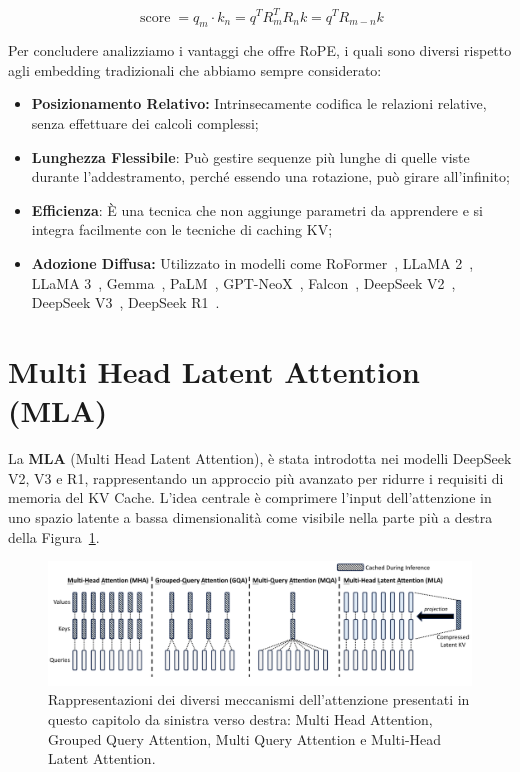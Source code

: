 \[
    \operatorname{score}= q_m\cdot k_n = q^TR_m^TR_nk = q^TR_{m-n}k
\]

Per concludere analizziamo i vantaggi che offre RoPE, i quali sono diversi rispetto agli embedding tradizionali che abbiamo sempre considerato:
\begin{itemize}
    \item \textbf{Posizionamento Relativo:} Intrinsecamente codifica le relazioni relative, senza effettuare dei calcoli complessi;
    \item \textbf{Lunghezza Flessibile}: Può gestire sequenze più lunghe di quelle viste durante l'addestramento, perché essendo una rotazione, può girare all'infinito;
    \item \textbf{Efficienza}: È una tecnica che non aggiunge parametri da apprendere e si integra facilmente con le tecniche di caching KV;
    \item \textbf{Adozione Diffusa:} Utilizzato in modelli come RoFormer~\cite{su2021roformer}, LLaMA 2~\cite{touvron2023llama}, LLaMA 3~\cite{touvron2024llama3}, Gemma~\cite{google2024gemma}, PaLM~\cite{chowdhery2022palm}, GPT-NeoX~\cite{black2022gptneox}, Falcon~\cite{penedo2023falcon}, DeepSeek V2~\cite{deepseek2023v2}, DeepSeek V3~\cite{deepseek2024v3}, DeepSeek R1~\cite{deepseek2024r1}.
\end{itemize}

\section{Multi Head Latent Attention (MLA)}

La \textbf{MLA} (Multi Head Latent Attention), è stata introdotta nei modelli DeepSeek V2, V3 e R1, rappresentando un approccio più avanzato per ridurre i requisiti di memoria del KV Cache. L'idea centrale è comprimere l'input dell'attenzione in uno spazio latente a bassa dimensionalità come visibile nella parte più a destra della Figura~\ref{fig:diffAttention}.


\begin{figure}
    \centering
    \includegraphics[width=\textwidth]{figure/DifferentAttention.png}
    \caption{Rappresentazioni dei diversi meccanismi dell'attenzione presentati in questo capitolo da sinistra verso destra: Multi Head Attention, Grouped Query Attention, Multi Query Attention e Multi-Head Latent Attention.}
    \label{fig:diffAttention}
\end{figure}


